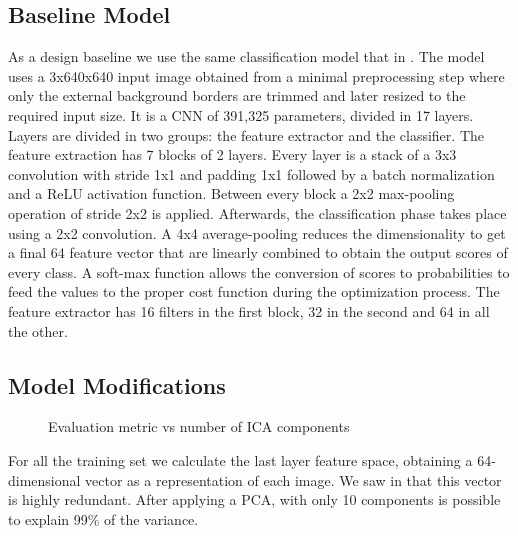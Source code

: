\documentclass{llncs}
\begin{document}
\subsection{Baseline Model}

As a design baseline we use the same classification model that in \cite{de2017deep}. The model uses a 3x640x640 input image obtained from a minimal preprocessing step where only the external background borders are trimmed and later resized to the required input size. It is a CNN of 391,325 parameters, divided in 17 layers. Layers are divided in two groups: the feature extractor and the classifier. The feature extraction has 7 blocks of 2 layers. Every layer is a stack of a 3x3 convolution with stride 1x1 and padding 1x1 followed by a batch normalization and a ReLU activation function. Between every block a 2x2 max-pooling operation of stride 2x2 is applied.  Afterwards, the classification phase takes place using a 2x2 convolution. A 4x4 average-pooling reduces the dimensionality to get a final 64 feature vector that are linearly combined to obtain the output scores of every class. A soft-max function allows the conversion of scores to probabilities to feed the values to the proper cost function during the optimization process. The feature extractor has 16 filters in the first block, 32 in the second and 64 in all the other.

\subsection{Model Modifications}

\begin{figure}
	\centering
	\caption{Evaluation metric vs number of ICA components}  
	\label{fig:ICA} 
\end{figure}

For all the training set we calculate the last layer feature space, obtaining a 64-dimensional vector as a representation of each image. We saw in \cite{de2017deep} that this vector is highly redundant. After applying a PCA, with only 10 components is possible to explain 99\% of the variance.
\end{document}

